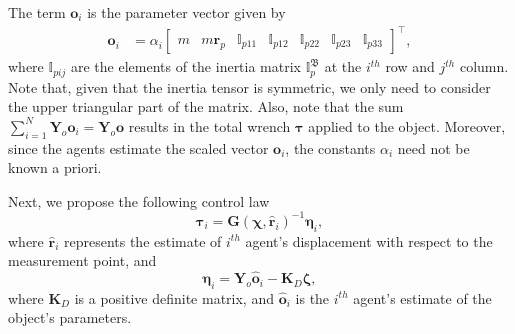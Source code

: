 The term $\mathbf{o}_i$ is the parameter vector given by
\begin{align}   
    \mathbf{o}_i &= \alpha_i\begin{bmatrix}
        m & m\mathbf{r}_p & \mathbb{I}_{p11} & \mathbb{I}_{p12} & \mathbb{I}_{p22} & \mathbb{I}_{p23} & \mathbb{I}_{p33}
    \end{bmatrix}^\top,
\end{align}
where $\mathbb{I}_{pij}$ are the elements of the inertia matrix $\mathbb{I}_p^\mathfrak{B}$ at the $i^{th}$ row and $j^{th}$ column. Note that, given that the inertia tensor is symmetric, we only need to consider the upper triangular part of the matrix. Also, note that the sum $\sum_{i=1}^N\mathbf{Y}_o\mathbf{o}_i=\mathbf{Y}_o\mathbf{o}$ results in the total wrench $\boldsymbol{\tau}$ applied to the object. Moreover, since the agents estimate the scaled vector $\mathbf{o}_i$, the constants $\alpha_i$ need not be known a priori.

Next, we propose the following control law
\begin{equation}
    \boldsymbol{\tau}_i = \mathbf{G}(\boldsymbol{\chi}, \hat{\mathbf{r}}_i)^{-1}\boldsymbol{\eta}_i,\label{eq:controlLawTaui}
\end{equation}
where $\hat{\mathbf{r}}_i$ represents the estimate of $i^{th}$ agent's displacement with respect to the measurement point, and
\begin{equation}
    \boldsymbol{\eta}_i = \mathbf{Y}_o\hat{\mathbf{o}}_i - \mathbf{K}_D\boldsymbol{\zeta}, \label{eq:controlLawEtai}
\end{equation}
where $\mathbf{K}_D$ is a positive definite matrix, and $\hat{\mathbf{o}}_i$ is the $i^{th}$ agent's estimate of the object's parameters. 


